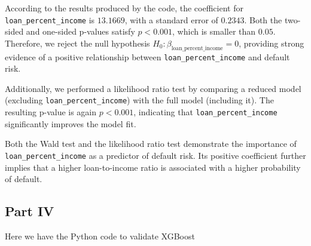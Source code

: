 \documentclass[letterpaper]{article}
\begin{document}
According to the results produced by the code, the coefficient for \texttt{loan\_percent\_income} is $13.1669$, with a standard error of $0.2343$. Both the two-sided and one-sided p-values satisfy $p < 0.001$, which is smaller than $0.05$. Therefore, we reject the null hypothesis $H_0:\beta_{\text{loan\_percent\_income}}=0$, providing strong evidence of a positive relationship between \texttt{loan\_percent\_income} and default risk.

Additionally, we performed a likelihood ratio test by comparing a reduced model (excluding \texttt{loan\_percent\_income}) with the full model (including it). The resulting p-value is again $p < 0.001$, indicating that \texttt{loan\_percent\_income} significantly improves the model fit.

Both the Wald test and the likelihood ratio test demonstrate the importance of \texttt{loan\_percent\_income} as a predictor of default risk. Its positive coefficient further implies that a higher loan-to-income ratio is associated with a higher probability of default.
		\clearpage
		\subsection{Part IV}
		
		Here we have the Python code to validate XGBoost
		
\end{document}
